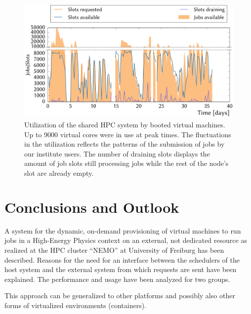 \begin{figure}
\begin{center}
  \includegraphics[width=0.9\linewidth]{figures/NEMO_KIT_utiliztion.pdf}
  \caption{Utilization of the shared HPC system by booted virtual machines. Up to 9000 virtual cores were in use at peak times. The fluctuations in the utilization reflects the patterns of the submission of jobs by our institute users. The number of draining slots displays the amount of job slots still processing jobs while the rest of the node's slot are already empty.}
  \label{fig-frplots}
\end{center}
\end{figure}


\section{Conclusions and Outlook}


A system for the dynamic, on-demand provisioning of virtual machines
to run jobs in a High-Energy Physics context on an external, not
dedicated resource as realized at the HPC
cluster ``NEMO'' at University of Freiburg has been described. 
Reasons for the need for an interface between the schedulers of the host system
and the external system from which requests are sent have been
explained. 
The performance and usage have been analyzed for two groups. 

This approach can be generalized to other platforms and possibly also
other forms of virtualized environments (containers).

















